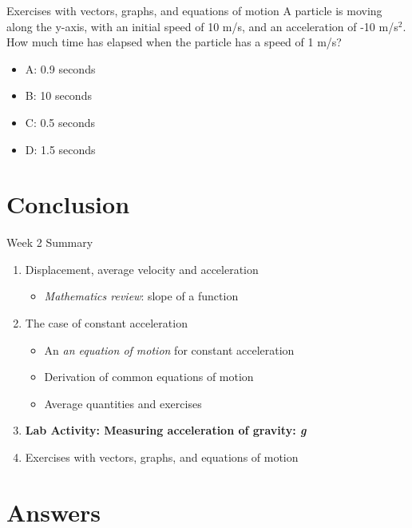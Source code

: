 \documentclass{beamer}
\begin{document}
\begin{frame}{Exercises with vectors, graphs, and equations of motion}
A particle is moving along the y-axis, with an initial speed of 10 m/s, and an acceleration of -10 m/s$^2$.  How much time has elapsed when the particle has a speed of 1 m/s?\\
\begin{itemize}
\item A: 0.9 seconds
\item B: 10 seconds
\item C: 0.5 seconds
\item D: 1.5 seconds
\end{itemize}
\end{frame}

\section{Conclusion}

\begin{frame}{Week 2 Summary}
\begin{enumerate}
\item Displacement, average velocity and acceleration
\begin{itemize}
\item \textit{Mathematics review}: slope of a function
\end{itemize}
\item The case of constant acceleration
\begin{itemize}
\item An \textit{an equation of motion} for constant acceleration
\item Derivation of \alert{common equations of motion}
\item Average quantities and exercises
\end{itemize}
\item \textbf{Lab Activity: Measuring acceleration of gravity: \textit{g}}
\item Exercises with vectors, graphs, and equations of motion
\end{enumerate}
\end{frame}

\section{Answers}
\end{document}
